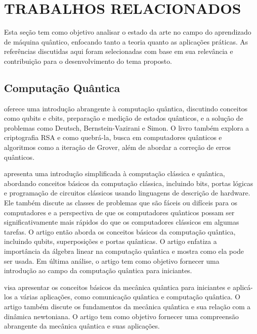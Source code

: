 \chapter{TRABALHOS RELACIONADOS}\label{chap_trabalhos_relacionados}

Esta seção tem como objetivo analisar o estado da arte no campo do aprendizado de máquina quântico, enfocando tanto a teoria quanto as aplicações práticas. As referências discutidas aqui foram selecionadas com base em sua relevância e contribuição para o desenvolvimento do tema proposto.

\section{Computação Quântica}

 oferece uma introdução abrangente à computação quântica, discutindo conceitos como qubits e cbits, preparação e medição de estados quânticos, e a solução de problemas como Deutsch, Bernstein-Vazirani e Simon. O livro também explora a criptografia RSA e como quebrá-la, busca em computadores quânticos e algoritmos como a iteração de Grover, além de abordar a correção de erros quânticos.

 apresenta uma introdução simplificada à computação clássica e quântica, abordando conceitos básicos da computação clássica, incluindo bits, portas lógicas e programação de circuitos clássicos usando linguagens de descrição de hardware. Ele também discute as classes de problemas que são fáceis ou difíceis para os computadores e a perspectiva de que os computadores quânticos possam ser significativamente mais rápidos do que os computadores clássicos em algumas tarefas. O artigo então aborda os conceitos básicos da computação quântica, incluindo qubits, superposições e portas quânticas. O artigo enfatiza a importância da álgebra linear na computação quântica e mostra como ela pode ser usada. Em última análise, o artigo tem como objetivo fornecer uma introdução ao campo da computação quântica para iniciantes.

 visa apresentar os conceitos básicos da mecânica quântica para iniciantes e aplicá-los a várias aplicações, como comunicação quântica e computação quântica. O artigo também discute os fundamentos da mecânica quântica e sua relação com a dinâmica newtoniana. O artigo tem como objetivo fornecer uma compreensão abrangente da mecânica quântica e suas aplicações.

